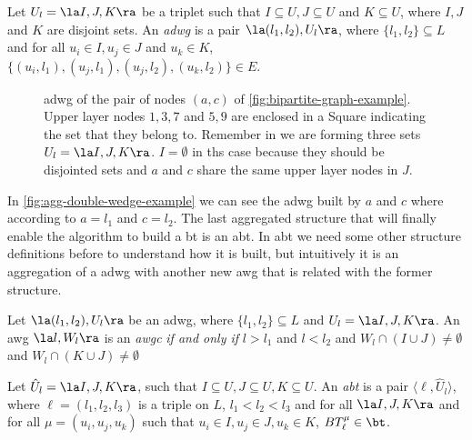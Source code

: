 \begin{definition}\label{def:adwg}
Let $U_l = \la I, J, K\ra$ be a triplet such that $I \subseteq U, J \subseteq U$ and $K \subseteq U$, where $I, J$ and $K$ are disjoint sets. 
An \textit{\acrfull{adwg}}  is a pair  $\la (l_1, l_2), U_l \ra$, where $\{l_1,l_2\}\subseteq L$ and  for all $u_i \in I, u_j \in J$ and $u_k \in K$, $\{(u_i, l_1), (u_j, l_1), (u_j, l_2), (u_k, l_2)\} \in E$.
\end{definition}
      
\begin{figure}[htp!]
\centering
{}
\caption[{[\acrshort{iebt}] Example Aggregated double-wedge}]{\acrlong{adwg} of the pair of nodes $(a,c)$ of \autoref{fig:bipartite-graph-example}. Upper layer nodes $1,3,7$ and $5,9$ are enclosed in a Square indicating the set that they belong to. Remember in  we are forming three sets $U_l = \la I, J, K \ra$. $I = \emptyset$ in ths case because they should be disjointed sets and $a$ and $c$ share the same upper layer nodes in $J$.}
\label{fig:agg-double-wedge-example}
\end{figure}

In \autoref{fig:agg-double-wedge-example} we can see the \acrshort{adwg} built by $a$ and $c$ where according to  $a = l_1$ and $c = l_2$.
The last aggregated structure that will finally enable the algorithm to build a \acrshort{bt} is an \acrlong{abt}. In \acrshort{abt} we need some other structure definitions before to understand how it is built, but intuitively it is an aggregation of a \acrshort{adwg} with another new \acrshort{awg} that is related with the former structure.

\begin{definition}\label{def:awgc}
Let $\la (l_1, l_2), U_l \ra$ be an \acrshort{adwg}, where $\{l_1,l_2\}\subseteq L$ and $U_l = \la I, J, K\ra$.
An \acrshort{awg} $\la l, W_l \ra$ is an \textit{\acrfull{awgc}} \emph{if and only if} $l > l_1$ and $l < l_2$ and $W_l \cap (I \cup J) \neq \emptyset$ and $W_l \cap (K \cup J) \neq \emptyset$
\end{definition}
      
\begin{definition}\label{def:abt}
Let $\hat{U}_l=\la I, J, K\ra$, such that $I \subseteq U, J \subseteq U, K \subseteq U$. An \textit{\acrfull{abt}}  is a pair  $\langle \ell, \hat{U}_l\rangle$, 
where $\ell=(l_1, l_2, l_3)$ is a triple on $L$, $l_1 < l_2 < l_3$ and for all $\la I, J, K\ra$ and for all $\mu=(u_i, u_j, u_k)$ such that $u_i \in I, u_j \in J, u_k \in K$, $BT_{\ell}^{\mu}\in \bt$.
\end{definition}

